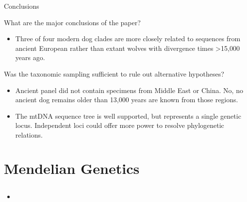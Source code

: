 \documentclass[12pt,a4paper]{article}
\begin{document}
\begin{itemize}
\begin{itemize}
        \end{itemize}
    \item Conclusions
        \begin{itemize}
            {\color{darklc} \item  What are the major conclusions of the paper?}
                \begin{itemize}
                    \item Three of four modern dog clades are more closely related to sequences from ancient European rather than extant wolves with divergence times >15,000 years ago.
                \end{itemize}
            {\color{darklc} \item  Was the taxonomic sampling sufficient to rule out alternative hypotheses? }
                \begin{itemize}
                    \item Ancient panel did not contain specimens from Middle East or China. No, no ancient dog remains older than 13,000 years are known from those regions.
                    \item The mtDNA sequence tree is well supported, but represents a single genetic locus. Independent loci could offer more power to resolve phylogenetic relations.
                \end{itemize}
        \end{itemize}
\end{itemize}

\clearpage
\setcounter{section}{5}
\section{Mendelian Genetics}
\subsection{}
\begin{itemize}
    \item 
\end{itemize}

\clearpage
{}
\clearpage
\section{}
\end{document}
